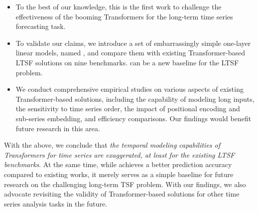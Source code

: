 \begin{itemize}

\item To the best of our knowledge, this is the first work to challenge the effectiveness of the booming Transformers for the long-term time series forecasting task. 

\item To validate our claims, we introduce a set of embarrassingly simple one-layer linear models, named \modelname, and compare them with existing Transformer-based LTSF solutions on nine benchmarks. \modelname can be a new baseline for the LTSF problem.

\item We conduct comprehensive empirical studies on various aspects of existing Transformer-based solutions, including the capability of modeling long inputs, the sensitivity to time series order, the impact of positional encoding and sub-series embedding, and efficiency comparisons. Our findings would benefit future research in this area. %


\end{itemize}

With the above, we conclude that \emph{the temporal modeling capabilities of Transformers for time series are exaggerated, at least for the existing LTSF benchmarks}. At the same time, while \modelname achieves a better prediction accuracy compared to existing works, it merely serves as a simple baseline for future research on the challenging long-term TSF problem. With our findings, we also advocate revisiting the validity of Transformer-based solutions for other time series analysis tasks in the future.


